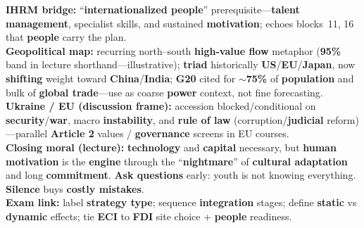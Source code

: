 \documentclass[10pt,a4paper]{article}
\begin{document}
{\textbf{IHRM bridge:} ``\textbf{internationalized people}'' prerequisite---\textbf{talent management}, specialist skills, and sustained \textbf{motivation}; echoes blocks~11, 16 that \textbf{people} carry the plan.\\
\textbf{Geopolitical map:} recurring north--south \textbf{high-value flow} metaphor (\textbf{95\%} band in lecture shorthand---illustrative); \textbf{triad} historically \textbf{US}/\textbf{EU}/\textbf{Japan}, now \textbf{shifting} weight toward \textbf{China}/\textbf{India}; \textbf{G20} cited for $\sim$\textbf{75\%} of \textbf{population} and bulk of \textbf{global trade}---use as coarse \textbf{power} context, not fine forecasting.\\
\textbf{Ukraine / EU (discussion frame):} accession blocked/conditional on \textbf{security}/\textbf{war}, macro \textbf{instability}, and \textbf{rule of law} (corruption/\textbf{judicial} reform)---parallel \textbf{Article 2} values / \textbf{governance} screens in EU courses.\\
\textbf{Closing moral (lecture):} \textbf{technology} and \textbf{capital} necessary, but \textbf{human motivation} is the \textbf{engine} through the ``\textbf{nightmare}'' of \textbf{cultural adaptation} and long \textbf{commitment}. \textbf{Ask questions} early: youth is not knowing everything. \textbf{Silence} buys \textbf{costly mistakes}.\\
\textbf{Exam link:} label \textbf{strategy type}; sequence \textbf{integration} stages; define \textbf{static} vs \textbf{dynamic} effects; tie \textbf{ECI} to \textbf{FDI} site choice + \textbf{people} readiness.
}
\end{document}
